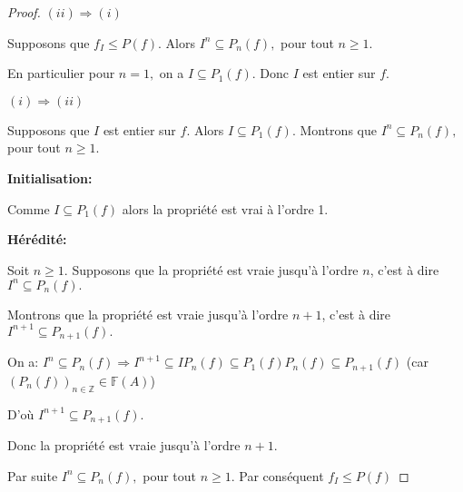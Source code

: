 \begin{proof}
	$(ii)\Longrightarrow (i)$
	
	Supposons que $f_{I}\leq P(f).$ Alors $I^{n}\subseteq P_{n}(f),$ pour tout $n\geq 1.$
	
	En particulier pour $n=1,$ on a $I\subseteq P_{1}(f).$ Donc $I$ est entier sur $f.$
	
	$(i)\Longrightarrow (ii)$
	
	Supposons que $I$ est entier sur $f.$ Alors $I\subseteq P_{1}(f).$ Montrons que $I^{n}\subseteq P_{n}(f),$ pour tout $n\geq 1.$
	
	\textbf{Initialisation:}
	
	Comme $I\subseteq P_{1}(f)$ alors la propriété est vrai à l'ordre 1.
	
	\textbf{Hérédité:}
	
	Soit $n\geq 1.$ Supposons que la propriété est vraie jusqu'à l'ordre $n$, c'est à dire $I^{n}\subseteq P_{n}(f).$
	
	Montrons que la propriété est vraie jusqu'à l'ordre $n+1$, c'est à dire $I^{n+1}\subseteq P_{n+1}(f).$
	
	On a: $I^{n}\subseteq P_{n}(f)\Longrightarrow I^{n+1}\subseteq
	IP_{n}(f)\subseteq P_{1}(f)P_{n}(f)\subseteq P_{n+1}(f)$ (car $%
	(P_{n}(f))_{n\in \mathbb{Z}}\in \mathbb{F}(A)$)
	
	D'où $I^{n+1}\subseteq P_{n+1}(f).$
	
	Donc la propriété est vraie jusqu'à l'ordre $n+1.$
	
	Par suite $I^{n}\subseteq P_{n}(f),$ pour tout $n\geq 1.$ Par conséquent $f_{I}\leq P(f)$
\end{proof}

